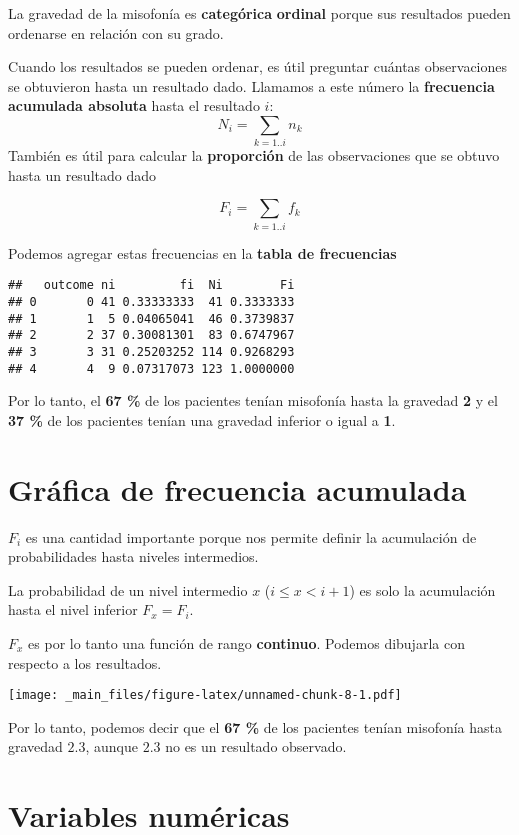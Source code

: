 \documentclass[
]{book}
\begin{document}
La gravedad de la misofonía es \textbf{categórica} \textbf{ordinal} porque sus resultados pueden ordenarse en relación con su grado.

Cuando los resultados se pueden ordenar, es útil preguntar cuántas observaciones se obtuvieron hasta un resultado dado. Llamamos a este número la \textbf{frecuencia acumulada absoluta} hasta el resultado \(i\):
\[N_i=\sum_{k=1..i} n_k\]
También es útil para calcular la \textbf{proporción} de las observaciones que se obtuvo hasta un resultado dado

\[F_i=\sum_{k=1..i} f_k\]

Podemos agregar estas frecuencias en la \textbf{tabla de frecuencias}

\begin{verbatim}
##   outcome ni         fi  Ni        Fi
## 0       0 41 0.33333333  41 0.3333333
## 1       1  5 0.04065041  46 0.3739837
## 2       2 37 0.30081301  83 0.6747967
## 3       3 31 0.25203252 114 0.9268293
## 4       4  9 0.07317073 123 1.0000000
\end{verbatim}

Por lo tanto, el \textbf{67 \%} de los pacientes tenían misofonía hasta la gravedad \textbf{2} y el \textbf{37 \%} de los pacientes tenían una gravedad inferior o igual a \textbf{1}.

\hypertarget{gruxe1fica-de-frecuencia-acumulada}{%
\section{Gráfica de frecuencia acumulada}\label{gruxe1fica-de-frecuencia-acumulada}}

\(F_i\) es una cantidad importante porque nos permite definir la acumulación de probabilidades hasta niveles intermedios.

La probabilidad de un nivel intermedio \(x\) (\(i\leq x< i+1\)) es solo la acumulación hasta el nivel inferior \(F_x=F_i\).

\(F_x\) es por lo tanto una función de rango \textbf{continuo}. Podemos dibujarla con respecto a los resultados.

\texttt{[image: \_main\_files/figure-latex/unnamed-chunk-8-1.pdf]}

Por lo tanto, podemos decir que el \textbf{67 \%} de los pacientes tenían misofonía hasta gravedad \(2.3\), aunque \(2.3\) no es un resultado observado.

\hypertarget{variables-numuxe9ricas}{%
\section{Variables numéricas}\label{variables-numuxe9ricas}}
\end{document}
